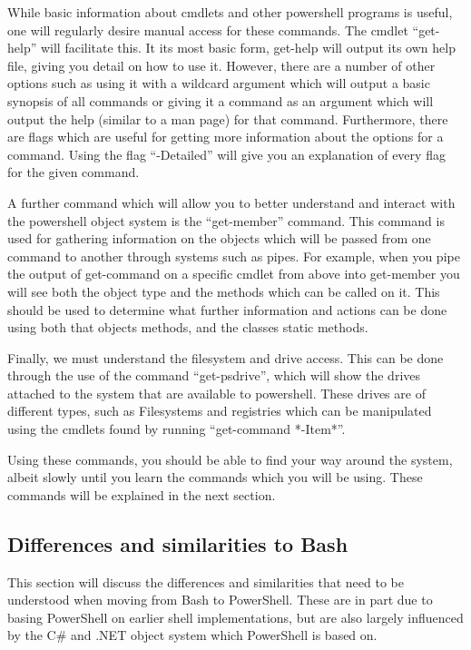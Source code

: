 \documentclass[a4paper,11pt]{report}
\begin{document}
			While basic information about cmdlets and other powershell programs is useful, one will regularly desire manual access for these commands. 
			The cmdlet ``get-help'' will facilitate this. 
			It its most basic form, get-help will output its own help file, giving you detail on how to use it. 
			However, there are a number of other options such as using it with a wildcard argument which will output a basic synopsis of all commands or giving it a command as an argument which will output the help (similar to a man page) for that command. 
			Furthermore, there are flags which are useful for getting more information about the options for a command. 
			Using the flag ``-Detailed'' will give you an explanation of every flag for the given command.

			A further command which will allow you to better understand and interact with the powershell object system is the ``get-member'' command. 
			This command is used for gathering information on the objects which will be passed from one command to another through systems such as pipes. 
			For example, when you pipe the output of get-command on a specific cmdlet from above into get-member you will see both the object type and the methods which can be called on it. 
			This should be used to determine what further information and actions can be done using both that objects methods, and the classes static methods. 

			Finally, we must understand the filesystem and drive access. 
			This can be done through the use of the command ``get-psdrive'', which will show the drives attached to the system that are available to powershell. 
			These drives are of different types, such as Filesystems and registries which can be manipulated using the cmdlets found by running ``get-command *-Item*''. 

			Using these commands, you should be able to find your way around the system, albeit slowly until you learn the commands which you will be using. 
			These commands will be explained in the next section. 

		\subsection{Differences and similarities to Bash}
			This section will discuss the differences and similarities that need to be understood when moving from Bash to PowerShell. 
			These are in part due to basing PowerShell on earlier shell implementations, but are also largely influenced by the C\# and .NET object system which PowerShell is based on. 
\end{document}
